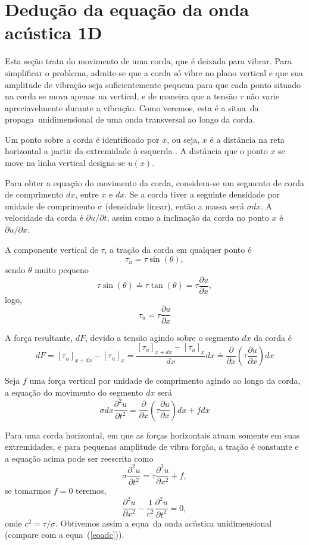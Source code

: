 %

\section{Dedu\c{c}\~ao da equa\c{c}\~ao da onda ac\'ustica 1D}
\label{dedonda}

Esta se\c{c}\~ao trata do movimento de uma corda, que \'e deixada
para vibrar. Para simplificar o problema, admite-se que a corda s\'o
vibre no plano vertical e que sua amplitude de vibra\c{c}\~ao seja
suficientemente pequena para que cada ponto situado na corda se mova
apenas na vertical, e de maneira que a tens\~ao $\tau$ n\~ao varie
apreciavelmente durante a vibra\c{c}\~ao. Como veremos, esta \'e a
situa\cao\ da propaga\cao\ unidimensional de uma onda transversal ao
longo da corda.

Um ponto sobre a corda \'e identificado por $x$, ou seja, $x$ \'e
a dist\^ancia na reta horizontal a partir da extremidade \`a
esquerda . A dist\^ancia que o ponto $x$ se move na linha vertical
designa-se $u(x)$.

Para obter a equa\c{c}\~ao do movimento da corda, considera-se um
segmento de corda de comprimento $dx$, entre $x$ e $dx$. Se a
corda tiver a seguinte densidade por unidade de comprimento
$\sigma$ (densidade linear), ent\~ao a massa ser\'a $\sigma dx$. A
velocidade da corda \'e $\partial u/\partial t$, assim como a
inclina\c{c}\~ao da corda no ponto $x$ \'e $\partial u/ \partial
x$.

A componente vertical de $\tau$, a tra\c{c}\~ao da corda em
qualquer ponto \'e
\[\tau_{u}=\tau \sin (\theta),\]
sendo $\theta$ muito pequeno
\[\tau \sin (\theta) \doteq \tau \tan (\theta)=\tau \frac{\partial u}{\partial x},\]
logo,
\[\tau_{u}=\tau\frac{\partial u}{\partial x}\]

A for\c{c}a resultante, $dF$, devido a tens\~ao agindo sobre o
segmento $dx$ da corda \'e
\[dF=[\tau_{u}]_{x+dx}-[\tau_{u}]_{x}=\frac{[\tau_{u}]_{x+dx}-[\tau_{u}]_{x}}{dx}dx
\doteq \frac{\partial}{\partial x}\left( \tau \frac{\partial
u}{\partial x}\right)dx\]

Seja $f$ uma for\c{c}a vertical por unidade de comprimento agindo
ao longo da corda, a equa\c{c}\~ao do movimento do segmento $dx$
ser\'a
\[\sigma dx \frac{\partial^{2}u}{\partial t^{2}}=\frac{\partial}{\partial x}\left( \tau \frac{\partial u}{\partial x}\right)dx+fdx\]

Para uma corda horizontal, em que as for\c{c}as horizontais atuam
somente em suas extremidades, e para pequenas amplitude de vibra
for\c{c}\~ao, a tra\c{c}\~ao  \'e constante e a equa\c{c}\~ao
acima pode ser reescrita como
\[\sigma \frac{\partial^{2}u}{\partial t^{2}}=\tau \frac{\partial^{2}u}{\partial x^{2}}+f,\]
se tomarmos $f=0$ teremos,
\begin{equation}\label{eqonda}
\frac{\partial^{2}u}{\partial x^{2}}-\frac{1}{c^{2}}
\frac{\partial^{2}u}{\partial t^{2}}=0,
\end{equation}
onde $c^{2}=\tau/\sigma$. Obtivemos assim a equa\cao\ da onda ac\'ustica
unidimensional (compare com a equa\cao\ (\ref{eoadc})).

